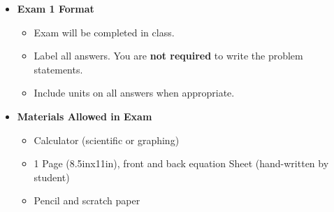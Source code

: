 \documentclass[11pt]{article}
\newcommand{\EXAMNUM}{1\hspace{0mm}}
\begin{document}
\begin{itemize}
             	\item  \textbf{\Large Exam \EXAMNUM \hspace{1mm} Format}
\begin{itemize}
		
			\item Exam will be completed in class.
			
			\item Label all answers. You are {\bf not required} to write the problem statements.

			\item Include units on all answers when appropriate. 
\end{itemize}


\vspace{5mm}		

		\item  \textbf{ Materials Allowed in Exam}

	\begin{itemize}

		\item  Calculator (scientific or graphing)
	
		\item  1 Page (8.5inx11in), front and back equation Sheet (hand-written by student)
			
		\item  Pencil and scratch paper
			

\end{itemize}
\end{itemize}
\end{document}
